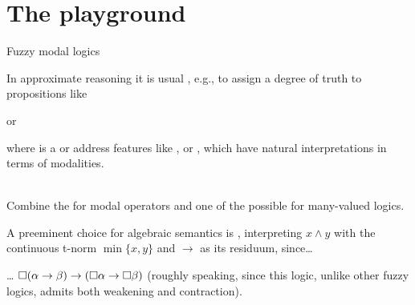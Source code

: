 
\section{The playground}


\begin{frame}{Fuzzy modal logics}
  
  
  In approximate reasoning it is usual , e.g., to
  assign a degree of truth to propositions like
  \begin{center}
     \quad or\quad {}
  \end{center}
  where  is a  or address
  features like ,  or ,
  which have natural interpretations in terms of modalities.

  \MSK

  \\
  Combine the  for modal operators and one of the
  possible  for many-valued logics.

  \MSK

  A preeminent choice for algebraic semantics is , interpreting $x\land y$ with the continuous t-norm
  $\min\{x,y\}$ and $\to$ as its residuum, since\dots
  
  \SSK  
  
  \dots{} $\Box
  (\alpha\to\beta) \to (\Box\alpha\to\Box\beta)$ 
(roughly speaking, since  this logic, unlike other fuzzy logics, admits both weakening and contraction).

  
  
  \VFILL
\end{frame}



